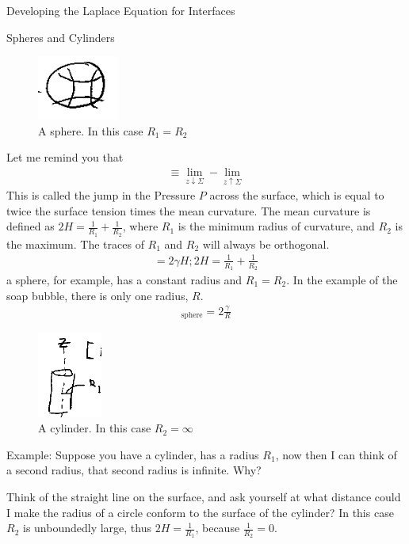 \documentclass{article}
\begin{document}
\begin{section}{Developing the Laplace Equation for Interfaces}
	\begin{subsection}{Spheres and Cylinders}
	\begin{figure}[h]
		\centering
			\includegraphics[height=60pt]{sphere}
			\caption{A sphere. In this case $R_1=R_2$}
			\label{fig:Sphere}
	\end{figure}
Let me remind you that 
\begin{align*}
  [P]\equiv \lim\limits_{z\downarrow\Sigma} - \lim\limits_{z\uparrow \Sigma}
\end{align*} 
This is called the jump in the Pressure $P$ across the surface, which is equal to twice the surface tension times the mean curvature. The mean curvature is defined as $2H = \frac{1}{R_1} + \frac{1}{R_2}$, where $R_1$ is the minimum radius of curvature, and $R_2$ is the maximum. The traces of $R_1$ and $R_2$ will always be orthogonal.
  \begin{align*}
    [P]= 2\gamma H; 2H = \frac{1}{R_1} + \frac{1}{R_2}
  \end{align*}
  a sphere, for example, has a constant radius and $R_1 = R_2$. In the example of the soap bubble, there is only one radius, $R$.
  \begin{align*}
		[P]_\text{sphere} = 2\frac{\gamma}{R}
    \label{}
  \end{align*}
	\begin{figure}[h]
		\centering
			\includegraphics[height=80pt]{cylinder}
			\caption{A cylinder. In this case $R_2 = \infty$}
		\label{fig:Cylinder}
	\end{figure}
Example: Suppose you have a cylinder, has a radius $R_1$, now then I can think of a second radius, that second radius is infinite. Why?

Think of the straight line on the surface, and ask yourself at what distance could I make the radius of a circle conform to the surface of the cylinder? In this case $R_2$ is unboundedly large, thus $2H = \frac{1}{R_1}$, because $\frac{1}{R_2} = 0$.
\end{subsection}


\end{section}
\end{document}
